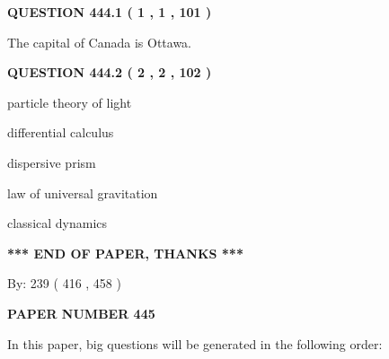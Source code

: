 \documentclass[12pt]{article}
\begin{document}
\vspace{0.2in}
  
{\textbf{\Large{QUESTION
444.1 
 ( 1 , 1 , 101 )
}}}
  
  
 
 
\noindent{}
 
 
The capital of Canada is Ottawa.
 
 
 
 
  
\vspace{0.2in}
  
{\textbf{\Large{QUESTION
444.2 
 ( 2 , 2 , 102 )
}}}
  
  
 
 
\noindent{}
 
 
particle theory of light
 
 
differential calculus
 
 
dispersive prism
 
 
law of universal gravitation
 
 
classical dynamics
 
 
 
 
   
   
\vspace{1.0in} 
{\textbf{\large{ *** END OF PAPER, THANKS *** }}} 
   
   
\hspace{1.0in} By: 
 239 ( 416 ,  458 )
   
   
   
   
\newpage 
\setcounter{page}{ 
   445001 } 
   
   
   
   
 {\textbf{ \Large{ PAPER NUMBER  445  }}}
   
   
\vspace{0.2in}
   
   
   
   
   
\vspace{0.2in}
   
In this paper, big questions will be generated in the following order: 
   
\end{document}
